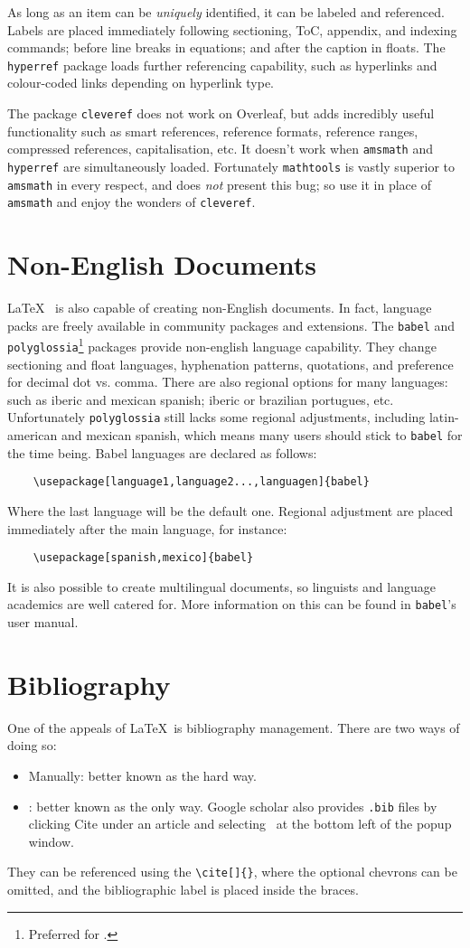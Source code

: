 As long as an item can be \emph{uniquely} identified, it can be labeled and referenced. Labels are placed immediately following sectioning, ToC, appendix, and indexing commands; before line breaks in equations; and after the caption in floats. The \verb|hyperref| package loads further referencing capability, such as hyperlinks and colour-coded links depending on hyperlink type.

The package \verb|cleveref| does not work on Overleaf, but adds incredibly useful functionality such as smart references, reference formats, reference ranges, compressed references, capitalisation, etc. It doesn't work when \verb|amsmath| and \verb|hyperref| are simultaneously loaded. Fortunately \verb|mathtools| is vastly superior to \verb|amsmath| in every respect, and does \emph{not} present this bug; so use it in place of \verb|amsmath| and enjoy the wonders of \verb|cleveref|.
%
\section{Non-English Documents}
%
\LaTeX~ is also capable of creating non-English documents. In fact, language packs are freely available in community packages and extensions. The \verb|babel| and \verb|polyglossia|\footnote{Preferred for \XeLaTeX.} packages provide non-english language capability. They change sectioning and float languages, hyphenation patterns, quotations, and preference for decimal dot vs. comma. There are also regional options for many languages: such as iberic and mexican spanish; iberic or brazilian portugues, etc. Unfortunately \verb|polyglossia| still lacks some regional adjustments, including latin-american and mexican spanish, which means many users should stick to \verb|babel| for the time being. Babel languages are declared as follows:
\begin{verbatim}
	\usepackage[language1,language2...,languagen]{babel}
\end{verbatim}
Where the last language will be the default one. Regional adjustment are placed immediately after the main language, for instance:
\begin{verbatim}
	\usepackage[spanish,mexico]{babel}
\end{verbatim}

It is also possible to create multilingual documents, so linguists and language academics are well catered for. More information on this can be found in \verb|babel|'s user manual.
%
\section{Bibliography}
%
One of the appeals of \LaTeX~is bibliography management. There are two ways of doing so:
\begin{itemize}
    \item Manually: better known as the hard way.
    \item \BibTeX: better known as the only way. Google scholar also provides \texttt{.bib} files by clicking Cite under an article and selecting \BibTeX~at the bottom left of the popup window.
\end{itemize}
They can be referenced using the \verb|\cite[]{}|, where the optional chevrons can be omitted, and the bibliographic label is placed inside the braces.
%
